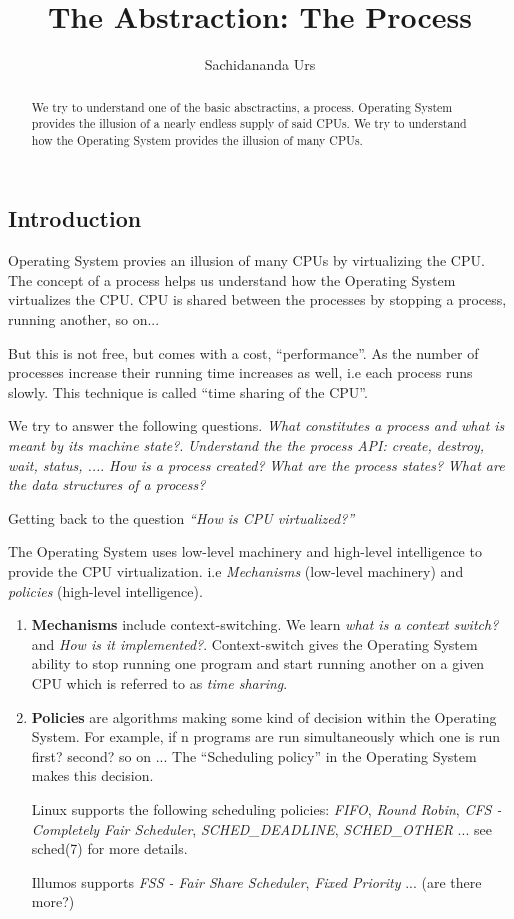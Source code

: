 \documentclass[11pt]{article}
\title{The Abstraction: The Process}
\author{Sachidananda Urs}
\begin{document}
\maketitle

\begin{abstract}
  We try to understand one of the basic absctractins, a process. Operating
  System provides the illusion of a nearly endless supply of said CPUs. We try
  to understand how the Operating System provides the illusion of many CPUs.
\end{abstract}

\subsection*{Introduction}

Operating System provies an illusion of many CPUs by virtualizing the CPU. The
concept of a process helps us understand how the Operating System virtualizes
the CPU. CPU is shared between the processes by stopping a process, running
another, so on...

But this is not free, but comes with a cost, ``performance''. As the number of
processes increase their running time increases as well, i.e each process runs
slowly. This technique is called ``time sharing of the CPU''.

We try to answer the following questions. \emph{What constitutes a process and
what is meant by its machine state?}. \emph{Understand the the process API:
  create, destroy, wait, status, ...}. \emph{How is a process created?}
\emph{What are the process states?} \emph{What are the data structures of a
  process?}

Getting back to the question \emph{``How is CPU virtualized?''}

The Operating System uses low-level machinery and high-level intelligence to
provide the CPU virtualization. i.e \emph{Mechanisms} (low-level machinery) and
\emph{policies} (high-level intelligence).

\begin{enumerate}
  \item \textbf{Mechanisms} include context-switching. We learn \emph{what is a
    context switch?} and \emph{How is it implemented?}. Context-switch gives the
    Operating System ability to stop running one program and start running
    another on a given CPU which is referred to as \emph{time sharing}.
  \item \textbf{Policies} are algorithms making some kind of decision within the
    Operating System. For example, if n programs are run simultaneously which
    one is run first? second? so on ... The ``Scheduling policy'' in the
    Operating System makes this decision.

    Linux supports the following scheduling policies: \emph{FIFO}, \emph{Round
      Robin}, \emph{CFS - Completely Fair Scheduler}, \emph{SCHED\_DEADLINE},
    \emph{SCHED\_OTHER} ... see sched(7) for more details.

    Illumos supports \emph{FSS - Fair Share Scheduler}, \emph{Fixed Priority}
    ... (are there more?)
\end{enumerate}
\end{document}
